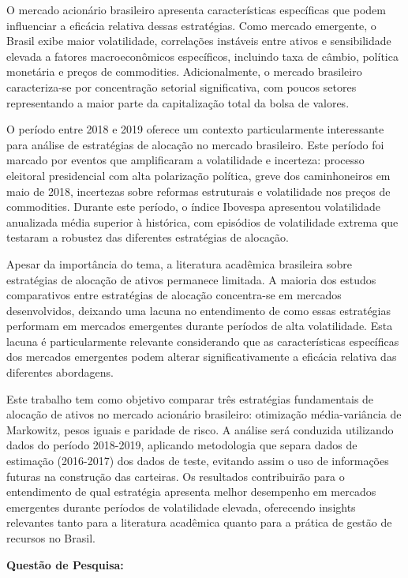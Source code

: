 O mercado acionário brasileiro apresenta características específicas que podem influenciar a eficácia relativa dessas estratégias. Como mercado emergente, o Brasil exibe maior volatilidade, correlações instáveis entre ativos e sensibilidade elevada a fatores macroeconômicos específicos, incluindo taxa de câmbio, política monetária e preços de commodities. Adicionalmente, o mercado brasileiro caracteriza-se por concentração setorial significativa, com poucos setores representando a maior parte da capitalização total da bolsa de valores.

O período entre 2018 e 2019 oferece um contexto particularmente interessante para análise de estratégias de alocação no mercado brasileiro. Este período foi marcado por eventos que amplificaram a volatilidade e incerteza: processo eleitoral presidencial com alta polarização política, greve dos caminhoneiros em maio de 2018, incertezas sobre reformas estruturais e volatilidade nos preços de commodities. Durante este período, o índice Ibovespa apresentou volatilidade anualizada média superior à histórica, com episódios de volatilidade extrema que testaram a robustez das diferentes estratégias de alocação.

Apesar da importância do tema, a literatura acadêmica brasileira sobre estratégias de alocação de ativos permanece limitada. A maioria dos estudos comparativos entre estratégias de alocação concentra-se em mercados desenvolvidos, deixando uma lacuna no entendimento de como essas estratégias performam em mercados emergentes durante períodos de alta volatilidade. Esta lacuna é particularmente relevante considerando que as características específicas dos mercados emergentes podem alterar significativamente a eficácia relativa das diferentes abordagens.

Este trabalho tem como objetivo comparar três estratégias fundamentais de alocação de ativos no mercado acionário brasileiro: otimização média-variância de Markowitz, pesos iguais e paridade de risco. A análise será conduzida utilizando dados do período 2018-2019, aplicando metodologia que separa dados de estimação (2016-2017) dos dados de teste, evitando assim o uso de informações futuras na construção das carteiras. Os resultados contribuirão para o entendimento de qual estratégia apresenta melhor desempenho em mercados emergentes durante períodos de volatilidade elevada, oferecendo insights relevantes tanto para a literatura acadêmica quanto para a prática de gestão de recursos no Brasil.

\textbf{Questão de Pesquisa:}

